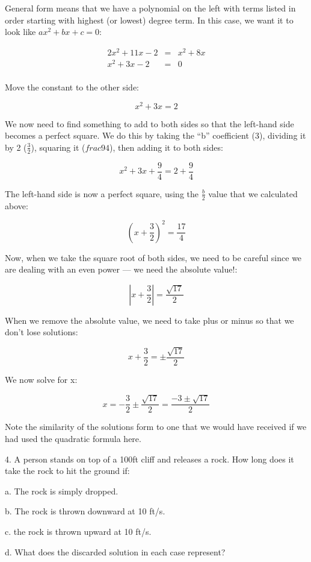 \documentclass[letterpaper, 12pt]{article}
\begin{document}
\bigskip

General form means that we have a polynomial on the left with terms listed in
order starting with highest (or lowest) degree term. In this case, we want it
to look like $ax^2+bx+c=0$:

\begin{eqnarray*}
2x^2+11x-2 &=& x^2+8x \\
x^2+3x-2 &=& 0 \\
\end{eqnarray*}

Move the constant to the other side:

\[x^2+3x=2\]

We now need to find something to add to both sides so that the left-hand side
becomes a perfect square. We do this by taking the ``b'' coefficient (3),
dividing it by 2 ($\frac{3}{2}$), squaring it ($frac{9}{4}$), then adding it to
both sides:

\[x^2+3x+\frac{9}{4}=2+\frac{9}{4}\]

The left-hand side is now a perfect square, using the $\frac{b}{2}$ value that
we calculated above:

\[\left(x+\frac{3}{2}\right)^2=\frac{17}{4}\]

Now, when we take the square root of both sides, we need to be careful since
we are dealing with an even power --- we need the absolute value!:

\[\left|x+\frac{3}{2}\right|=\frac{\sqrt{17}}{2}\]

When we remove the absolute value, we need to take plus or minus so that we
don't lose solutions:

\[x+\frac{3}{2}=\pm\frac{\sqrt{17}}{2}\]

We now solve for x:

\[x=-\frac{3}{2}\pm\frac{\sqrt{17}}{2}=\frac{-3\pm\sqrt{17}}{2}\]

Note the similarity of the solutions form to one that we would have received if
we had used the quadratic formula here.

\bigskip

4. A person stands on top of a 100ft cliff and releases a rock.  How long does
it take the rock to hit the ground if:

\begin{description}
\item{a.} The rock is simply dropped.
\item{b.} The rock is thrown downward at 10 ft/s.
\item{c.} the rock is thrown upward at 10 ft/s.
\item{d.} What does the discarded solution in each case represent?
\end{description}
\end{document}
